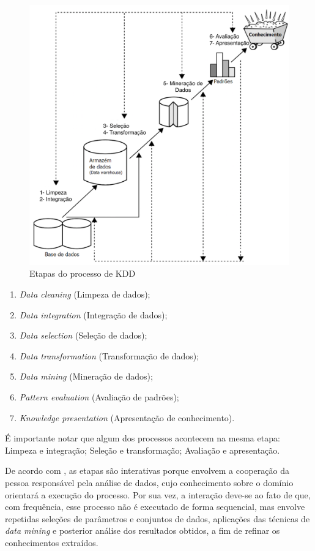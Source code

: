 \begin{figure}
	\centering
	\includegraphics[width=1\textwidth]{Cap3/imagens/kdd2}
	\caption{Etapas do processo de KDD}
	\label{kdd-fig}
\end{figure}

\begin{enumerate}
	\item \textit{Data cleaning} (Limpeza de dados);
	\item \textit{Data integration} (Integração de dados);
	\item \textit{Data selection} (Seleção de dados);
	\item \textit{Data transformation} (Transformação de dados);
	\item \textit{Data mining} (Mineração de dados);
	\item \textit{Pattern evaluation} (Avaliação de padrões);
	\item \textit{Knowledge presentation} (Apresentação de conhecimento).
\end{enumerate}

É importante notar que algum dos processos acontecem na mesma etapa: Limpeza e integração; Seleção e transformação; Avaliação e apresentação.

De acordo com , as etapas são interativas porque envolvem a cooperação da pessoa responsável pela análise de dados, cujo conhecimento sobre o domínio orientará a execução do processo. Por sua vez, a interação deve-se ao fato de que, com frequência, esse processo não é executado de forma sequencial, mas envolve repetidas seleções de parâmetros e conjuntos de dados, aplicações das técnicas de \textit{data mining} e posterior análise dos resultados obtidos, a fim de refinar os conhecimentos extraídos.

